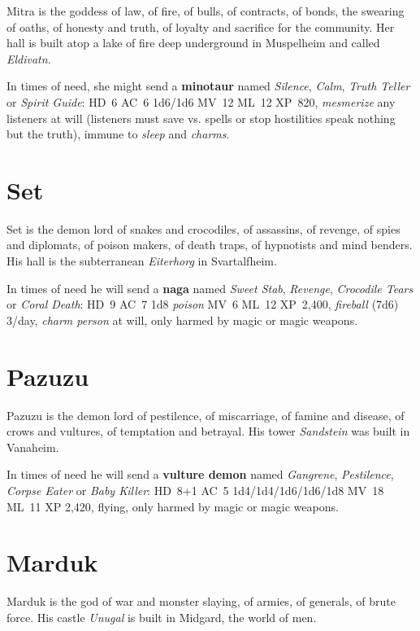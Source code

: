 \documentclass[a4paper,serif]{rpg-module}
\begin{document}
Mitra is the goddess of law, of fire, of bulls, of contracts, of
bonds, the swearing of oaths, of honesty and truth, of loyalty and
sacrifice for the community. Her hall is built atop a lake of fire
deep underground in Muspelheim and called \emph{Eldivatn}.

In times of need, she might send a \textbf{minotaur} named
\textit{Silence}, \textit{Calm}, \textit{Truth Teller} or
\textit{Spirit Guide}: HD~6 AC~6 1d6/1d6 MV~12 ML~12 XP~820,
\textit{mesmerize} any listeners at will (listeners must save vs.
spells or stop hostilities speak nothing but the truth), immune to
\textit{sleep} and \textit{charms}.

\section{Set}

Set is the demon lord of snakes and crocodiles, of assassins, of
revenge, of spies and diplomats, of poison makers, of death traps, of
hypnotists and mind benders. His hall is the subterranean
\emph{Eiterhorg} in Svartalfheim.

In times of need he will send a \textbf{naga} named \textit{Sweet
  Stab}, \textit{Revenge}, \textit{Crocodile Tears} or \textit{Coral
  Death}: HD~9 AC~7 1d8 \textit{poison} MV~6 ML~12 XP~2,400,
\textit{fireball} (7d6) 3/day, \textit{charm person} at will, only
harmed by magic or magic weapons.

\section{Pazuzu}

Pazuzu is the demon lord of pestilence, of miscarriage, of famine and
disease, of crows and vultures, of temptation and betrayal. His tower
\emph{Sandstein} was built in Vanaheim.

In times of need he will send a \textbf{vulture demon} named
\textit{Gangrene}, \textit{Pestilence}, \textit{Corpse Eater} or
\textit{Baby Killer}: HD~8+1 AC~5 1d4/1d4/1d6/1d6/1d8 MV~18 ML~11 XP
2,420, flying, only harmed by magic or magic weapons.

\section{Marduk}

Marduk is the god of war and monster slaying, of armies, of generals,
of brute force. His castle \emph{Unugal} is built in Midgard, the
world of men.
\end{document}
